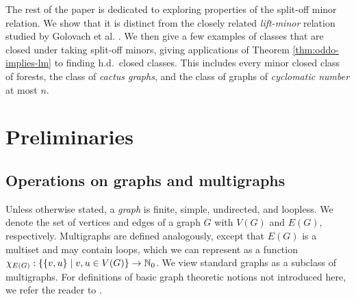 \documentclass[11pt]{article}
\begin{document}
\par 
The rest of the paper is dedicated to exploring properties of the split-off minor relation. We show that it is distinct from the closely related \emph{lift-minor} relation studied by Golovach et al. \cite{GOLOVACH2014286}. We then give a few examples of classes that are closed under taking split-off minors, giving applications of Theorem \ref{thm:oddo-implies-lm} to finding h.d.\ closed classes. This includes every minor closed class of forests, the class of \emph{cactus graphs}, and the class of graphs of \emph{cyclomatic number} at most $n$.


\section{Preliminaries}
\subsection{Operations on graphs and multigraphs}
Unless otherwise stated, a \emph{graph} is finite, simple, undirected, and loopless. We denote the set of vertices and edges of a graph $G$ with $V(G)$ and $E(G)$, respectively.
Multigraphs are defined analogously, except that $E(G)$ is a multiset and may contain loops, which we can represent as a function $\chi_{E(G)}: \{ \{v,u\} \mid v,u \in V(G) \} \to \mathbb{N}_0$. We view standard graphs as a subclass of multigraphs. For definitions of basic graph theoretic notions not introduced here, we refer the reader to \cite{diestel2025graph}.
\end{document}
